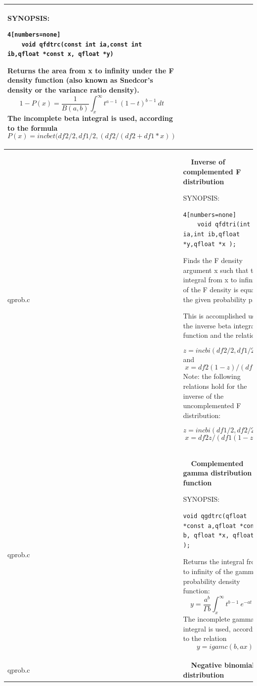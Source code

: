 \documentclass[10pt,a4paper,x11names]{memoir} %
\newcounter{entry}
\newcommand{\TOC}[1] {\addcontentsline{toc}{section}{\theentry\ \  #1} \textbf{\theentry\ \  #1} \par\stepcounter{entry}}
\begin{document}
\begin{longtable}{|p{1.5cm}|p{11.5cm}|}
	{\footnotesize SYNOPSIS:}\vspace{-0.2cm}\index{qfdtrc}
	\begin{lstlisting}4[numbers=none]
	void qfdtrc(const int ia,const int ib,qfloat *const x, qfloat *y)
	\end{lstlisting}\vspace{-0.2cm}
	
	Returns the area from x to infinity under the F density
	function (also known as Snedcor's density or the
	variance ratio density).
	$$ 1-P(x)=\frac{1}{B(a,b)} \int_{x}^{\infty}t^{a-1}\ (1-t)^{b-1}\ dt$$
	The incomplete beta integral is used, according to the
	formula
	$$P(x) = incbet( df2/2, df1/2, (df2/(df2 + df1*x) )$$
	\\\hline
	qprob.c&	\TOC{Inverse of complemented F distribution}
	
	{\footnotesize SYNOPSIS:}\vspace{-0.2cm}\index{qfdtri}
	\begin{lstlisting}4[numbers=none]
	void qfdtri(int ia,int ib,qfloat *y,qfloat *x );
	\end{lstlisting}\vspace{-0.2cm}
	
	Finds the F density argument x such that the integral from x to infinity of the F density is equal to the
	given probability p.
	
	This is accomplished using the inverse beta integral function and the relations
	
	$$z = incbi( df2/2, df1/2, p )$$ and
	$$x = df2 (1-z) / (df1 z)$$
	Note: the following relations hold for the inverse of
	the uncomplemented F distribution:
	
	$$z = incbi( df1/2, df2/2, p )$$
	$$x = df2 z / (df1 (1-z))$$
	\\\hline
	qprob.c& \TOC{Complemented gamma distribution function}
	
	{\footnotesize SYNOPSIS:}\vspace{-0.2cm}\index{qgdtrc}
	\begin{lstlisting}[numbers=none]
void qgdtrc(qfloat *const a,qfloat *const b, qfloat *x, qfloat *y );
	\end{lstlisting}\vspace{-0.2cm}
	
	Returns the integral from x to infinity of the gamma
	probability density function:
	$$ y = \frac{a^b}{\Gamma b}\int_{x}^{\infty}t^{b-1}\ e^{-at}\ dt$$
	The incomplete gamma integral is used, according to the
	relation $$y = igamc( b, ax )$$
	\\\hline
	qprob.c& \TOC{Negative binomial distribution}
	

\end{longtable}
\end{document}
